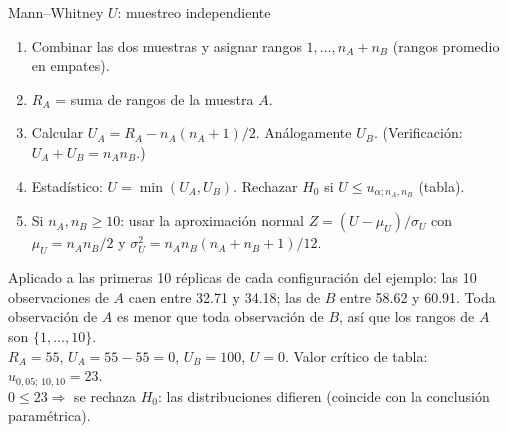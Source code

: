 \documentclass[aspectratio=1610, 10pt]{beamer}
\begin{document}
\begin{frame}{Mann--Whitney $U$: muestreo independiente}
\begin{metodobox}[Procedimiento]
\begin{enumerate}
\item Combinar las dos muestras y asignar rangos $1,\ldots,n_A+n_B$ (rangos promedio en empates).
\item $R_A$ = suma de rangos de la muestra $A$.
\item Calcular $U_A = R_A - n_A(n_A+1)/2$. Análogamente $U_B$. (Verificación: $U_A + U_B = n_A n_B$.)
\item Estadístico: $U = \min(U_A, U_B)$. Rechazar $H_0$ si $U \le u_{\alpha; n_A,n_B}$ (tabla).
\item Si $n_A, n_B \ge 10$: usar la aproximación normal $Z = (U - \mu_U)/\sigma_U$ con $\mu_U = n_A n_B/2$ y $\sigma_U^2 = n_A n_B(n_A+n_B+1)/12$.
\end{enumerate}
\end{metodobox}

\vspace{0.2cm}
\begin{ejemplobox}
Aplicado a las primeras 10 réplicas de cada configuración del ejemplo: las 10 observaciones de $A$ caen entre 32.71 y 34.18; las de $B$ entre 58.62 y 60.91. Toda observación de $A$ es menor que toda observación de $B$, así que los rangos de $A$ son $\{1,\ldots,10\}$.
\\
$R_A = 55$, $U_A = 55 - 55 = 0$, $U_B = 100$, $U = 0$. Valor crítico de tabla: $u_{0{,}05;\,10,10} = 23$. \\
$0 \le 23 \Rightarrow$ se rechaza $H_0$: las distribuciones difieren \textcolor{deepgreen}{(coincide con la conclusión paramétrica)}.
\end{ejemplobox}
\end{frame}
\end{document}

